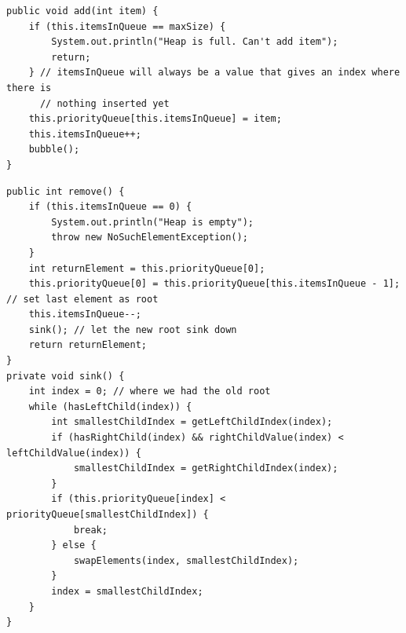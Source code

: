 \documentclass[a4paper,11pt]{article}
\newenvironment{code}{\captionsetup{type=listing}}{}
\begin{document}
\begin{code}
    \label{code:ArrayAdd}
    \begin{verbatim}
public void add(int item) {
    if (this.itemsInQueue == maxSize) {
        System.out.println("Heap is full. Can't add item");
        return;
    } // itemsInQueue will always be a value that gives an index where there is
      // nothing inserted yet
    this.priorityQueue[this.itemsInQueue] = item;
    this.itemsInQueue++;
    bubble();
}
    \end{verbatim}
\end{code}
\begin{code}
    \label{code:ArrayRemove}
    \begin{verbatim}
public int remove() {
    if (this.itemsInQueue == 0) {
        System.out.println("Heap is empty");
        throw new NoSuchElementException();
    }
    int returnElement = this.priorityQueue[0];
    this.priorityQueue[0] = this.priorityQueue[this.itemsInQueue - 1]; // set last element as root
    this.itemsInQueue--;
    sink(); // let the new root sink down
    return returnElement;
}
private void sink() {
    int index = 0; // where we had the old root
    while (hasLeftChild(index)) {
        int smallestChildIndex = getLeftChildIndex(index);
        if (hasRightChild(index) && rightChildValue(index) < leftChildValue(index)) {
            smallestChildIndex = getRightChildIndex(index);
        }
        if (this.priorityQueue[index] < priorityQueue[smallestChildIndex]) {
            break;
        } else {
            swapElements(index, smallestChildIndex);
        }
        index = smallestChildIndex;
    }
}
    \end{verbatim}
\end{code}
\end{document}

